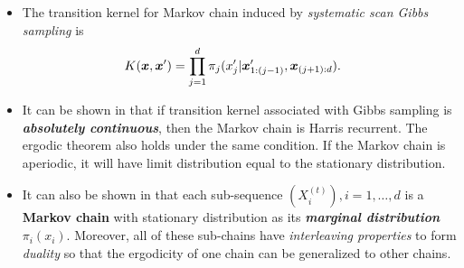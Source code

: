 \documentclass[11pt]{article}
\begin{document}
\begin{itemize}
\item The transition kernel for Markov chain induced by \emph{systematic scan Gibbs sampling} is 
\begin{align}
K(\boldsymbol{x}, \boldsymbol{x}') &= \prod_{j=1}^{d}\pi_{j}(x_{j}'| \boldsymbol{x}_{1:(j-1)}', \boldsymbol{x}_{(j+1):d}). \label{eqn: gibbs_kernel}
\end{align}

\item It can be shown in \citep{robert1999monte} that if transition kernel associated with Gibbs sampling is \emph{\textbf{absolutely continuous}}, then the Markov chain is Harris recurrent. The ergodic theorem also holds under the same condition. If the Markov chain is aperiodic, it will have limit distribution equal to the stationary distribution. 

\item It can also be shown in \citep{robert1999monte} that each sub-sequence $(X_i^{(t)}), i=1,\ldots, d$ is a \textbf{Markov chain} with stationary distribution as its \emph{\textbf{marginal distribution}} $\pi_{i}(x_i)$. Moreover, all of these sub-chains have \emph{interleaving properties} to form \emph{duality} so that the ergodicity of one chain can be generalized to other chains.
\end{itemize}
\end{document}
